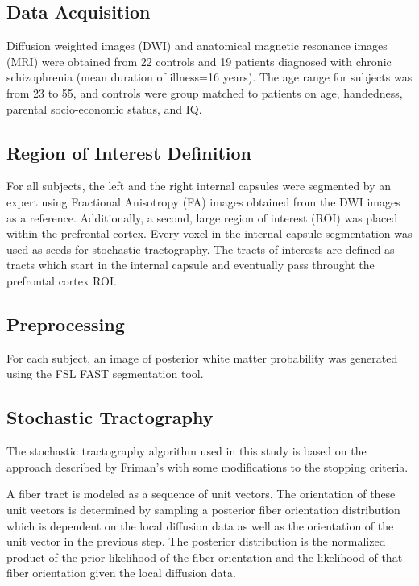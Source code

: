 \documentclass{article}
\begin{document}

  
\subsection{Data Acquisition}
Diffusion weighted images (DWI) and anatomical magnetic resonance images (MRI) were obtained from 22 controls and 19 patients diagnosed with chronic schizophrenia (mean duration of illness=16 years). The age range for subjects was from 23 to 55, and controls were group matched to patients on age, handedness, parental socio-economic status, and IQ. 

\subsection{Region of Interest Definition}
For all subjects, the left and the right internal capsules were segmented by an expert using Fractional Anisotropy (FA) images obtained from the DWI images as a reference. Additionally, a second, large region of interest (ROI) was placed within the prefrontal cortex.  Every voxel in the internal capsule segmentation was used as seeds for stochastic tractography.  The tracts of interests are defined as tracts which start in the internal capsule and eventually pass throught the prefrontal cortex ROI.

\subsection{Preprocessing}
For each subject, an image of posterior white matter probability was generated using the FSL FAST segmentation tool.

\subsection{Stochastic Tractography}
The stochastic tractography algorithm used in this study is based on the approach described by Friman's \cite{frimanTMI06} with some modifications to the stopping criteria.

A fiber tract is modeled as a sequence of unit vectors.  The orientation of these unit vectors is determined by sampling a posterior fiber orientation distribution which is dependent on the local diffusion data as well as the orientation of the unit vector in the previous step.  The posterior distribution is the normalized product of the prior likelihood of the fiber orientation and the likelihood of that fiber orientation given the local diffusion data.
\end{document}

